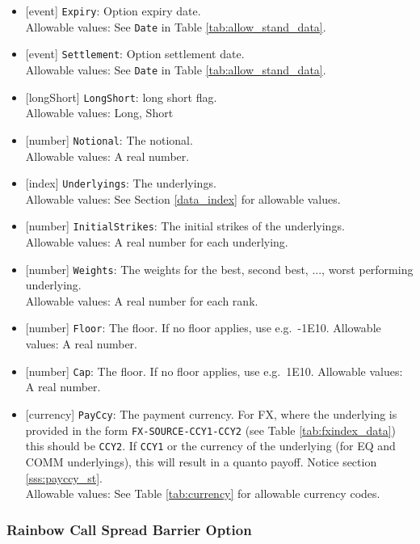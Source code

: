 \begin{itemize}
    \item{}[event] \lstinline!Expiry!: Option expiry date. \\
      Allowable values: See \lstinline!Date! in Table \ref{tab:allow_stand_data}.
    \item{}[event] \lstinline!Settlement!: Option settlement date. \\
      Allowable values: See \lstinline!Date! in Table \ref{tab:allow_stand_data}.
    \item{}[longShort] \lstinline!LongShort!: long short flag. \\
      Allowable values: Long, Short
    \item{}[number] \lstinline!Notional!: The notional. \\
      Allowable values: A real number.
    \item{}[index] \lstinline!Underlyings!: The underlyings. \\
      Allowable values: See Section \ref{data_index} for allowable values.
      \item{}[number] \lstinline!InitialStrikes!: The initial strikes of the underlyings.\\
        Allowable values: A real number for each underlying.
      \item{}[number] \lstinline!Weights!: The weights for the best, second best, ..., worst performing underlying.\\
        Allowable values: A real number for each rank.
      \item{}[number] \lstinline!Floor!: The floor. If no floor applies, use e.g.\ -1E10.
        Allowable values: A real number.
      \item{}[number] \lstinline!Cap!: The floor. If no floor applies, use e.g.\ 1E10.
        Allowable values: A real number.
      \item{}[currency] \lstinline!PayCcy!: The payment currency. For FX, where the underlying is provided
      in the form \lstinline!FX-SOURCE-CCY1-CCY2! (see Table \ref{tab:fxindex_data}) this should
      be \lstinline!CCY2!. If \lstinline!CCY1! or the currency of the underlying (for EQ and
      COMM underlyings), this will result in a quanto payoff. Notice section \ref{sss:payccy_st}. \\
        Allowable values: See Table \ref{tab:currency} for allowable currency codes.
 \end{itemize}

\subsubsection*{Rainbow Call Spread Barrier Option}

